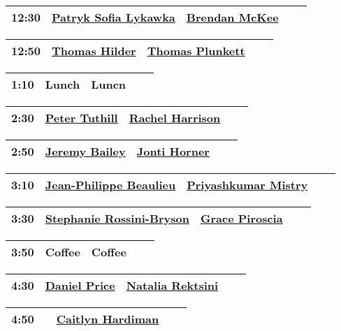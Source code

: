 \documentclass{article}
\begin{document}
\begin{longtable}{|c | c | c | c | c|}
\hline
12:30 & \href{speakers/patryk-sofia-lykawka/_index.md}{Patryk Sofia Lykawka} & \href{speakers/brendan-mckee/_index.md}{Brendan McKee} \\
\hline
\end{longtable}
\begin{longtable}{|c | c | c | c | c|}
\hline
12:50 & \href{speakers/thomas-hilder/_index.md}{Thomas Hilder} & \href{speakers/thomas-plunkett/_index.md}{Thomas Plunkett} \\
\hline
\end{longtable}
\begin{longtable}{|c | c | c | c | c|}
\hline
1:10 & Lunch & Luncn \\
\hline
\end{longtable}
\begin{longtable}{|c | c | c | c | c|}
\hline
2:30 & \href{speakers/peter-tuthill/_index.md}{Peter Tuthill} & \href{speakers/rachel-harrison/_index.md}{Rachel Harrison} \\
\hline
\end{longtable}
\begin{longtable}{|c | c | c | c | c|}
\hline
2:50 & \href{speakers/jeremy-bailey/_index.md}{Jeremy Bailey} & \href{speakers/jonti-horner/_index.md}{Jonti Horner} \\
\hline
\end{longtable}
\begin{longtable}{|c | c | c | c | c|}
\hline
3:10 & \href{speakers/jean-philippe-beaulieu/_index.md}{Jean-Philippe Beaulieu} & \href{speakers/priyashkumar-mistry/_index.md}{Priyashkumar Mistry} \\
\hline
\end{longtable}
\begin{longtable}{|c | c | c | c | c|}
\hline
3:30 & \href{speakers/stephanie-rossini-bryson/_index.md}{Stephanie Rossini-Bryson} & \href{speakers/grace-piroscia/_index.md}{Grace Piroscia} \\
\hline
\end{longtable}
\begin{longtable}{|c | c | c | c | c|}
\hline
3:50 & Coffee & Coffee \\
\hline
\end{longtable}
\begin{longtable}{|c | c | c | c | c|}
\hline
4:30 & \href{speakers/daniel-price/_index.md}{Daniel Price} & \href{speakers/natalia-rektsini/_index.md}{Natalia Rektsini} \\
\hline
\end{longtable}
\begin{longtable}{|c | c | c | c | c|}
\hline
4:50 &  & \href{speakers/caitlyn-hardiman/_index.md}{Caitlyn Hardiman} \\
\hline
\end{longtable}
\end{document}
